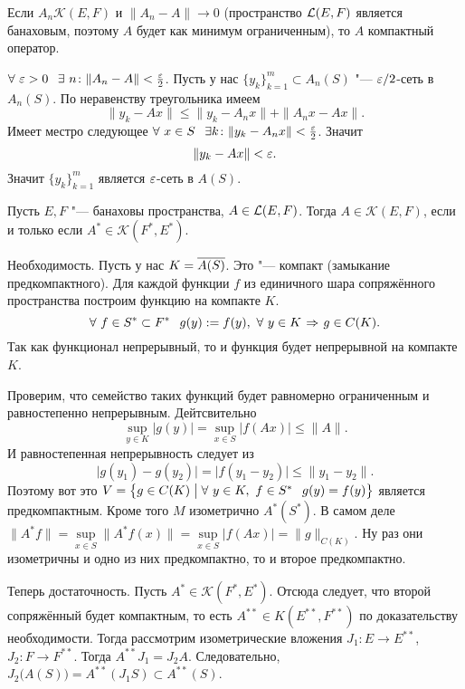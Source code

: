 \begin{Lem}
  Если $A_n\mathcal K(E,F)$ и $\|A_n-A\|\to 0$ (пространство $\mathcal L(E,F)$ является банаховым, поэтому $A$ будет как минимум ограниченным), то $A$ компактный оператор.
\end{Lem}
\begin{Proof}
 $\forall\ \e>0\pau \exists\ n\colon \|A_n-A\|<\frac\e2$.
 Пусть у нас $\{y_k\}_{k=1}^m\subset A_n(S)$ "--- $\varepsilon/2$-сеть в $A_n(S)$.
По неравенству треугольника имеем
\[
  \|y_k-Ax\|\le \|y_k-A_nx\| + \|A_nx - Ax\|.
\]
Имеет местро следующее $\forall\ x\in S\pau \exists k\colon \|y_k - A_n x\|<\frac\e2$. Значит
\[
  \|y_k-Ax\|<\varepsilon.
\]
Значит $\{y_k\}_{k=1}^m$ является $\varepsilon$-сеть в $A(S)$.
\end{Proof}
\begin{The}[Шаудера]
  Пусть $E,F$ "--- банаховы пространства, $A\in\mathcal L(E,F)$. Тогда $A\in\mathcal K(E,F)$, если и только если $A^*\in\mathcal K(F^*,E^*)$.
\end{The}
\begin{Proof}
 Необходимость.  Пусть у нас $K = \overline{A(S)}$. Это "--- компакт (замыкание предкомпактного). Для каждой функции $f$ из единичного шара сопряжённого пространства построим функцию на компакте $K$.
\[
  \forall\ f\in S^*\subset F^*\pau
  g(y) := f(y),\ \forall\ y\in K\imp g\in C(K).
\]
Так как функционал непрерывный, то и функция будет непрерывной на компакте $K$.

Проверим, что семейство таких функций будет равномерно ограниченным и равностепенно непрерывным. Дейтсвительно
\[
  \sup\limits_{y\in K} \big|g(y)\big| = \sup\limits_{x\in S} \big|f(Ax)\big|\le \|A\|.
\]
И равностепенная непрерывность следует из
\[
  \big|g(y_1)-g(y_2)\big| = \big|f(y_1-y_2)\big|\le \|y_1-y_2\|.
\]
Поэтому вот это $V = \big\{g\in C(K)\bigm| \forall\ y\in K,\ f\in S^*\hskip .75em plus.1em minus.08em\relax g(y) = f(y)\big\}$ является предкомпактным. Кроме того $M$ изометрично $A^*(S^*)$.
В самом деле $\|A^*f\| = \sup\limits_{x\in S}\big\|A^* f(x)\big\| = \sup\limits_{x\in S} \big|f(Ax)\big| = \|g\|_{C(K)}$. Ну раз они изометричны и одно из них предкомпактно, то и второе предкомпактно.

Теперь достаточность.
Пусть $A^*\in\mathcal K(F^*,E^*)$. Отсюда следует, что второй сопряжённый будет компактным, то есть $A^{**}\in K(E^{**},F^{**})$ по доказательству необходимости. 
Тогда рассмотрим изометрические вложения  
$J_1\colon E \to E^{**}$, $J_2\colon F\to F^{**}$. Тогда $A^{**} J_1 = J_2A$. Следовательно, $J_2\big(A(S)\big) = A^{**}(J_1S)\subset A^{**}(S)$.
\end{Proof}

